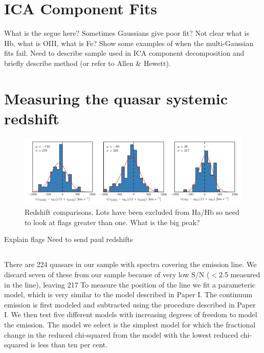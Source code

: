 \section{ICA Component Fits}

What is the segue here? 
Sometimes Gaussians give poor fit? Not clear what is Hb, what is OIII, what is Fe? Show some examples of when the multi-Gaussian fits fail. 
Need to describe sample used in ICA component decomposition and briefly describe method (or refer to Allen \& Hewett). 


\section{Measuring the quasar systemic redshift}


\begin{figure}
    \includegraphics[width=2\columnwidth]{figures/chapter04/redshift_comparison.pdf} 
    \caption{Redshift comparisons. Lots have been excluded from Ha/Hb so need to look at flags greater than one. What is the big peak?}       
    \label{fig:redshift_comparison}
\end{figure}

Explain flags 
Need to send paul redshifts 

\subsection{\hans}

There are 224 quasars in our sample with spectra covering the \ha emission line. 
We discard seven of these from our sample because of very low S/N ($<$2.5 measured in the \ha line), leaving 217
To measure the position of the line we fit a parameteric model, which is very similar to the model described in Paper I. 
The continuum emission is first modeled and subtracted using the procedure described in Paper I. 
We then test five different models with increasing degrees of freedom to model the \ha emission. 
The model we select is the simplest model for which the fractional change in the reduced chi-squared from the model with the lowest reduced chi-squared is less than ten per cent. 

